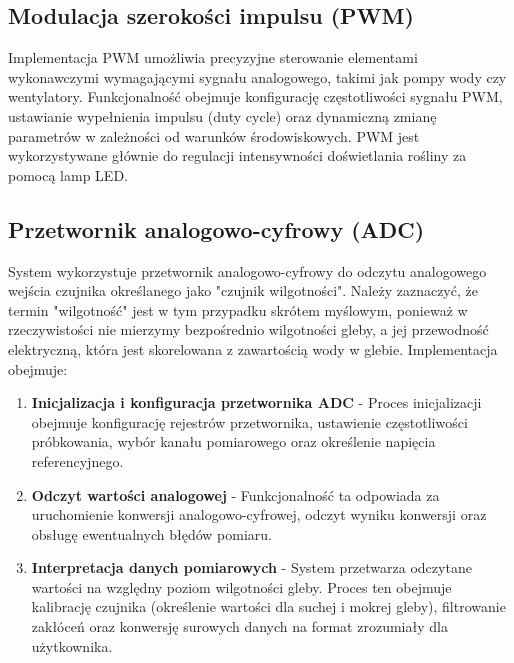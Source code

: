 \documentclass{article}
\begin{document}
\subsection{Modulacja szerokości impulsu (PWM)}
Implementacja PWM umożliwia precyzyjne sterowanie elementami wykonawczymi wymagającymi sygnału analogowego, takimi jak pompy wody czy wentylatory. Funkcjonalność obejmuje konfigurację częstotliwości sygnału PWM, ustawianie wypełnienia impulsu (duty cycle) oraz dynamiczną zmianę parametrów w zależności od warunków środowiskowych. PWM jest wykorzystywane głównie do regulacji intensywności doświetlania rośliny za pomocą lamp LED.

\subsection{Przetwornik analogowo-cyfrowy (ADC)}
System wykorzystuje przetwornik analogowo-cyfrowy do odczytu analogowego wejścia czujnika określanego jako "czujnik wilgotności". Należy zaznaczyć, że termin "wilgotność" jest w tym przypadku skrótem myślowym, ponieważ w rzeczywistości nie mierzymy bezpośrednio wilgotności gleby, a jej przewodność elektryczną, która jest skorelowana z zawartością wody w glebie. Implementacja obejmuje:

\begin{enumerate}
    \item \textbf{Inicjalizacja i konfiguracja przetwornika ADC} - Proces inicjalizacji obejmuje konfigurację rejestrów przetwornika, ustawienie częstotliwości próbkowania, wybór kanału pomiarowego oraz określenie napięcia referencyjnego.
    
    \item \textbf{Odczyt wartości analogowej} - Funkcjonalność ta odpowiada za uruchomienie konwersji analogowo-cyfrowej, odczyt wyniku konwersji oraz obsługę ewentualnych błędów pomiaru.
    
    \item \textbf{Interpretacja danych pomiarowych} - System przetwarza odczytane wartości na względny poziom wilgotności gleby. Proces ten obejmuje kalibrację czujnika (określenie wartości dla suchej i mokrej gleby), filtrowanie zakłóceń oraz konwersję surowych danych na format zrozumiały dla użytkownika.
\end{enumerate}
\end{document}
